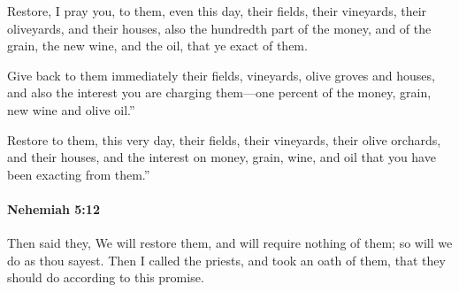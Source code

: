 			\begin{versebox}
					\item[BHS] 
					\item[LXX] 
					\item[ASV] Restore, I pray you, to them, even this day, their fields, their vineyards, their oliveyards, and their houses, also the hundredth part of the money, and of the grain, the new wine, and the oil, that ye exact of them.
					\item[NIV] Give back to them immediately their fields, vineyards, olive groves and houses, and also the interest you are charging them—one percent of the money, grain, new wine and olive oil.”
					\item[NRSV] Restore to them, this very day, their fields, their vineyards, their olive orchards, and their houses, and the interest on money, grain, wine, and oil that you have been exacting from them.”
			\end{versebox}

		\paragraph{Nehemiah 5:12} %
			\label{NEHEMIAH-5-12}

			Then said they, We will restore them, and will require nothing of them; so will we do as thou sayest. Then I called the priests, and took an oath of them, that they should do according to this promise.

